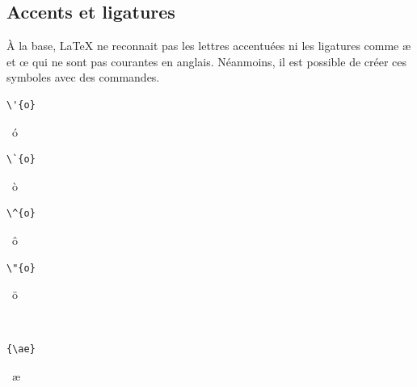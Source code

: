 {\subsection{Accents et ligatures}
\label{sec:bases:caracteres:accents}

À la base, {\LaTeX} ne reconnait pas les lettres accentuées ni les
ligatures comme {\ae} et {\oe} qui ne sont pas courantes en anglais.
Néanmoins, il est possible de créer ces symboles avec des commandes.
\begin{demo}
  \begin{minipage}{0.2\linewidth}
    \begin{texample}
\begin{lstlisting}
\'{o}
\end{lstlisting}
      \producing\ \'{o}
    \end{texample}
  \end{minipage}
  \hfill
  \begin{minipage}{0.2\linewidth}
    \begin{texample}
\begin{lstlisting}[escapeinside={}]
\`{o}
\end{lstlisting}
      \producing\ \`{o}
    \end{texample}
  \end{minipage}
  \hfill
  \begin{minipage}{0.2\linewidth}
    \begin{texample}
\begin{lstlisting}
\^{o}
\end{lstlisting}
      \producing\ \^{o}
    \end{texample}
  \end{minipage}
  \hfill
  \begin{minipage}{0.2\linewidth}
    \begin{texample}
\begin{lstlisting}
\"{o}
\end{lstlisting}
      \producing\ \"{o}
    \end{texample}
  \end{minipage} \\
  \hfill
  \begin{minipage}{0.2\linewidth}
    \begin{texample}
\begin{lstlisting}
{\ae}
\end{lstlisting}
      \producing\ \ae
    \end{texample}
  \end{minipage}

\end{demo}}
